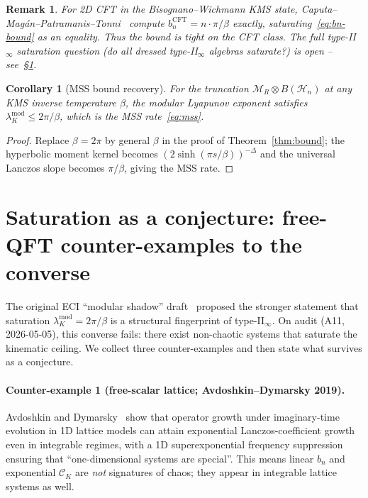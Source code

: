 \documentclass[12pt,a4paper]{article}
\newtheorem{remark}{Remark}
\newtheorem{corollary}[theorem]{Corollary}
\begin{document}
\begin{remark}\label{rem:caputa-bridge}
For 2D CFT in the Bisognano--Wichmann KMS state, Caputa--Mag\'{a}n--Patramanis--Tonni~\cite{Caputa2024}
compute $b_n^{\mathrm{CFT}} = n\cdot\pi/\beta$ exactly,
saturating~\eqref{eq:bn-bound} as an equality.
Thus the bound is tight on the CFT class.
The full type-II$_\infty$ saturation question (do all dressed
type-II$_\infty$ algebras saturate?) is open --
see~\S\ref{sec:saturation}.
\end{remark}

\begin{corollary}[MSS bound recovery]
For the truncation $\mathcal{M}_R \otimes B(\mathcal{H}_n)$ at any
KMS inverse temperature $\beta$, the modular Lyapunov exponent
satisfies $\lambda_K^{\mathrm{mod}} \le 2\pi/\beta$,
which is the MSS rate~\eqref{eq:mss}.
\end{corollary}

\begin{proof}
Replace $\beta = 2\pi$ by general $\beta$ in the proof of
Theorem~\ref{thm:bound}; the hyperbolic moment kernel becomes
$(2\sinh(\pi s/\beta))^{-\Delta}$ and the universal Lanczos slope
becomes $\pi/\beta$, giving the MSS rate.
\end{proof}

\section{Saturation as a conjecture: free-QFT counter-examples to the
         converse}
\label{sec:saturation}

The original ECI ``modular shadow'' draft~\cite{ECI_v6} proposed the
stronger statement that saturation $\lambda_K^{\mathrm{mod}} = 2\pi/\beta$
is a structural fingerprint of type-II$_\infty$.
On audit (A11, 2026-05-05), this converse fails: there exist
non-chaotic systems that saturate the kinematic ceiling.
We collect three counter-examples and then state what survives as a
conjecture.

\paragraph{Counter-example 1 (free-scalar lattice; Avdoshkin--Dymarsky 2019).}
Avdoshkin and Dymarsky~\cite{AvdoshkinDymarsky2019} show that
operator growth under imaginary-time evolution in 1D lattice models
can attain exponential Lanczos-coefficient growth even in integrable
regimes, with a 1D superexponential frequency suppression ensuring
that ``one-dimensional systems are special''.
This means linear $b_n$ and exponential $\mathcal{C}_K$ are
\emph{not} signatures of chaos; they appear in integrable lattice
systems as well.
\end{document}

